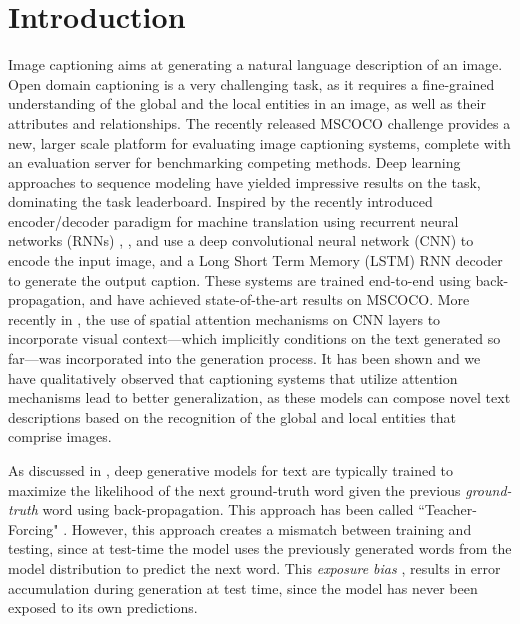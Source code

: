 \documentclass[10pt,twocolumn,letterpaper]{article}
\begin{document}
\section{Introduction}
Image captioning aims at generating a natural language description of an image. Open domain captioning is a very challenging task, as it requires a fine-grained understanding of the global and the local entities in an image, as well as their attributes and relationships. 
The recently released MSCOCO challenge \cite{MSCOCO} provides a new, larger scale platform for evaluating image captioning systems, complete with an evaluation server for benchmarking competing methods. Deep learning approaches to sequence modeling have yielded impressive results on the task, dominating the task leaderboard. Inspired by the recently introduced encoder/decoder paradigm for machine translation using recurrent  neural networks (RNNs) \cite{ChoMGBSB14}, \cite{GoogleNIC}, and \cite{KarpathyF14} use a deep convolutional neural network (CNN) to encode the input image, and a Long Short Term Memory (LSTM) \cite{HochreiterLSTM} RNN decoder to generate the output caption. These systems are trained end-to-end using back-propagation, and have achieved state-of-the-art results on MSCOCO. More recently in \cite{CapAttention}, the  use of spatial attention mechanisms on CNN layers to incorporate visual context---which implicitly conditions on the text generated so far---was incorporated into the  generation process. It has been shown and we have qualitatively observed that captioning systems that utilize attention mechanisms lead to better generalization, as these models can compose novel text descriptions based on the recognition of the global and local entities that comprise images.

As discussed in \cite{Ranzato}, deep generative models for text are typically trained to maximize the likelihood of the next ground-truth word given the previous \emph{ground-truth} word using back-propagation. This approach has been called ``Teacher-Forcing" \cite{ScheduledSampling}. However, this approach creates a mismatch between training and testing, since at test-time the model uses the previously generated words from the model distribution to predict the next word. This \emph{exposure bias} \cite{Ranzato}, results in error accumulation during generation at test time, since the model has never been exposed to its own predictions.
\end{document}
